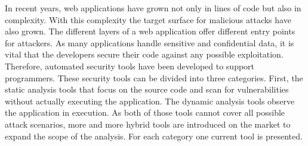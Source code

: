 In recent years, web applications have grown not only in lines of code but also in complexity. With this complexity the target surface for malicious attacks have also grown. The different layers of a web application offer different entry points for attackers. As many applications handle sensitive and confidential data, it is vital that the developers secure their code against any possible exploitation.
Therefore, automated security tools have been developed to support programmers. These security tools can be divided into three categories. First, the static analysis tools that focus on the source code and scan for vulnerabilities without actually executing the application. The dynamic analysis tools observe the application in execution. As both of those tools cannot cover all possible attack scenarios, more and more hybrid tools are introduced on the market to expand the scope of the analysis. For each category one current tool is presented.